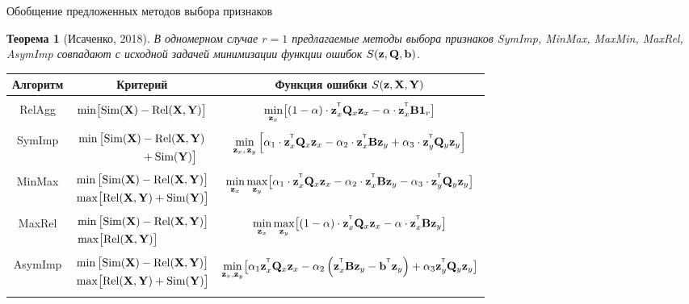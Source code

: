 \documentclass[10pt]{beamer}
\newtheorem{rustheorem}{Теорема}
\begin{document}
\begin{frame}{Обобщение предложенных методов выбора признаков}
	\begin{rustheorem}[Исаченко, 2018]
		В одномерном случае $r=1$ предлагаемые методы выбора признаков SymImp, MinMax, MaxMin, MaxRel, AsymImp совпадают с исходной задачей минимизации функции ошибок $S(\bz, \bQ, \mathbf{b})$.
	\end{rustheorem}
	\vspace{-0.2cm}
	\begin{table}
		\centering
		\footnotesize{
			\begin{tabular}{c|c|c}
				\hline
				Алгоритм & Критерий & Функция ошибки $S(\bz, \bX, \bY)$ \\
				\hline && \\ 
				RelAgg & $\min \bigl[ \text{Sim}(\bX) - \text{Rel}(\bX, \bY) \bigr] $ & $\min\limits_{\bz_x} \bigl[ (1 - \alpha) \cdot \bz_x^{\T} \bQ_x \bz_x - \alpha \cdot \bz_x^{\T} \bB \bOne_r \bigr] $ \\ &&\\
				SymImp & $\begin{aligned} \min \, \bigl[ \text{Sim}(\bX) & - \text{Rel}(\bX, \bY) \\ & + \text{Sim}(\bY) \bigr] \end{aligned}$ & $ \min\limits_{\bz_x, \, \bz_y} \left[ \alpha_1 \cdot \bz_x^{\T} \bQ_x \bz_x - \alpha_2 \cdot \bz_x^{\T} \bB \bz_y + \alpha_3 \cdot \bz_y^{\T} \bQ_y \bz_y \right] $\\ &&\\ 
				MinMax & $\begin{aligned} &\min \, \bigl[ \text{Sim}(\bX) - \text{Rel}(\bX, \bY) \bigr]  \\ & \max \bigl[\text{Rel}(\bX, \bY) + \text{Sim}(\bY) \bigr] \end{aligned}$ & $	\min\limits_{\bz_x} 	\max\limits_{\bz_y} \bigl[\alpha_1 \cdot \bz_x^{\T} \bQ_x \bz_x - \alpha_2 \cdot \bz_x^{\T} \bB \bz_y - \alpha_3 \cdot \bz_y^{\T} \bQ_y \bz_y \bigr]$ \\ &&\\ 
				MaxRel & $\begin{aligned} &\min \, \bigl[ \text{Sim}(\bX) - \text{Rel}(\bX, \bY) \bigr]  \\ & \max \bigl[\text{Rel}(\bX, \bY) \bigr] \end{aligned}$& $\min\limits_{\bz_x} 	\max\limits_{\bz_y} \bigl[ (1 - \alpha) \cdot \bz_x^{\T} \bQ_x \bz_x - \alpha \cdot \bz_x^{\T} \bB \bz_y \bigr]$ \\ 		&&\\
				AsymImp & $\begin{aligned} & \min \, \bigl[ \text{Sim}(\bX) - \text{Rel}(\bX, \bY) \bigr]\\ &  \max \bigl[\text{Rel}(\bX, \bY) + \text{Sim}(\bY) \bigr] \end{aligned}$ & $\min\limits_{\bz_x, \bz_y} \bigl[ \alpha_1 \bz_x^{\T} \bQ_x \bz_x - \alpha_2 \left(\bz_x^{\T} \bB \bz_y - \bb^{\T} \bz_y \right) + \alpha_3  \bz_y^{\T} \bQ_y \bz_y \bigr]$\\  && \\
				\hline
		\end{tabular}}
	\end{table}
\end{frame}
\end{document}
